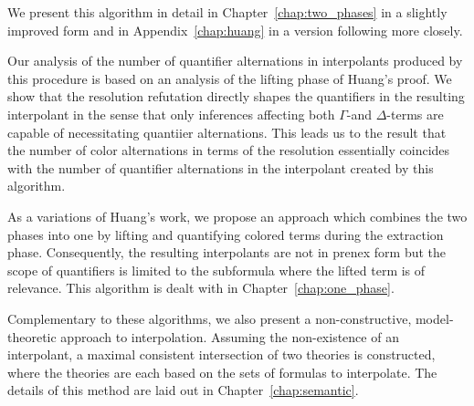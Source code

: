 We present this algorithm in detail in Chapter~\ref{chap:two_phases} in a slightly improved form and in Appendix~\ref{chap:huang} in a version following \cite{Huang95} more closely. 


Our analysis of the number of quantifier alternations in interpolants produced by this procedure is based on an analysis of the lifting phase of Huang's proof.
We show that the resolution refutation directly shapes the quantifiers in the resulting interpolant 
in the sense that only inferences affecting both $\Gamma$-and $\Delta$-terms are capable of necessitating quantiier alternations.
This leads us to the result that 
the number of color alternations in terms of the resolution essentially coincides with the number of quantifier alternations in the interpolant created by this algorithm.





As a variations of Huang's work, we propose an approach which combines the two phases into one 
by lifting and quantifying colored terms during the extraction phase. 
Consequently, the resulting interpolants are not in prenex form but the scope of quantifiers is limited to the subformula where the lifted term is of relevance.
This algorithm is dealt with in Chapter~\ref{chap:one_phase}.

Complementary to these algorithms, we also present a non-constructive, model-theoretic approach to interpolation.
Assuming the non-existence of an interpolant, a maximal consistent intersection of two theories is constructed, where the theories are each based on the sets of formulas to interpolate. The details of this method are laid out in Chapter~\ref{chap:semantic}.


